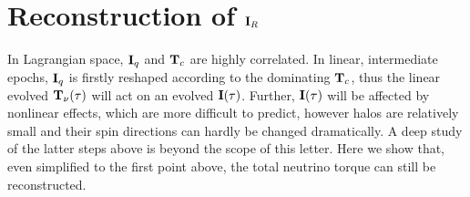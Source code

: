 \documentclass[aps,prd,twocolumn,amsmath,amssymb,amsfont,superscriptaddress,nofootinbib]{revtex4-1}
\newcommand{\T}{\bold{T}}
\newcommand{\I}{\bold{I}}
\begin{document}

%


\appendix
\section{Reconstruction of $\I_R$}\label{app.I}
In Lagrangian space, $\I_q$ and $\T_c$ are highly correlated.
In linear, intermediate epochs, $\I_q$ is firstly reshaped according to the dominating $\T_c$, thus the linear evolved $\T_\nu(\tau)$ will act on an evolved $\I(\tau)$.
Further, $\I(\tau)$ will be affected by nonlinear effects, which are more difficult to predict, however halos are relatively small and their spin directions can hardly be changed dramatically.
A deep study of the latter steps above is beyond the scope of this letter. Here we show that, even simplified to the first point above, the total neutrino torque can still be reconstructed.
\end{document}
